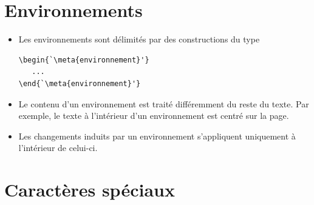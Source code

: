 \section{Environnements}

\begin{itemize}
\item Les environnements sont délimités par des constructions du type
\begin{lstlisting}
\begin{`\meta{environnement}'}
   ...
\end{`\meta{environnement}'}
\end{lstlisting}
\item Le contenu d'un environnement est traité différemment du reste
  du texte. Par exemple, le texte à l'intérieur d'un environnement
   est centré sur la page.
\item Les changements induits par un environnement s'appliquent
  uniquement à l'intérieur de celui-ci.
\end{itemize}


\section{Caractères spéciaux}

